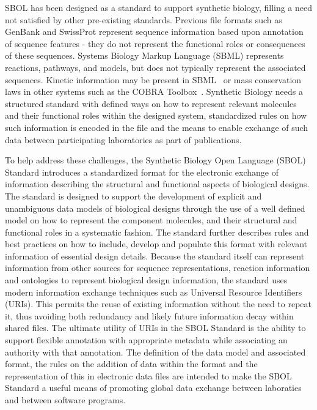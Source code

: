 SBOL has been designed as a standard to support synthetic biology, filling a need not satisfied by other pre-existing standards. Previous file formats such as GenBank and SwissProt represent sequence information based upon annotation of sequence features - they do not represent the functional roles or consequences of these sequences. Systems Biology Markup Language (SBML) represents reactions, pathways, and models, but does not typically represent the associated sequences.  Kinetic information may be present in SBML~\cite{SBML} or mass conservation laws in other systems such as the COBRA Toolbox~\cite{COBRA}. Synthetic Biology needs a structured standard with defined ways on how to represent relevant molecules and their functional roles within the designed system, standardized rules on how such information is encoded in the file and the means to enable exchange of such data between participating laboratories as part of publications. 

To help address these challenges, the Synthetic Biology Open Language (SBOL) Standard introduces a standardized format for the electronic exchange of information describing the structural and functional aspects of biological designs. 
The standard is designed to support the development of explicit and unambiguous data models of biological designs through the use of a well defined model on how to represent the component molecules, and their structural and functional roles in a systematic fashion. 
The standard further describes rules and best practices on how to include, develop and populate this format with relevant information of essential design details. 
Because the standard itself can represent information from other sources for sequence representations, reaction information and ontologies to represent biological design information, the standard uses modern information exchange techniques such as Universal Resource Identifiers (URIs). This permits the reuse of existing information without the need to repeat it, thus avoiding both redundancy and likely future information decay within shared files. 
The ultimate utility of URIs in the SBOL Standard is the ability to support flexible annotation with appropriate metadata while associating an authority with that annotation. 
The definition of the data model and associated format, the rules on the addition of data within the format and the representation of this in electronic data files are intended to make the SBOL Standard a useful means of promoting global data exchange between laboraties and between software programs.

